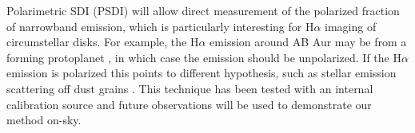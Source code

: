 Polarimetric SDI (PSDI) will allow direct measurement of the polarized fraction of narrowband emission, which is particularly interesting for H$\alpha$ imaging of circumstellar disks. For example, the H$\alpha$ emission around AB Aur may be from a forming protoplanet \citep{currie_images_2022}, in which case the emission should be unpolarized. If the H$\alpha$ emission is polarized this points to different hypothesis, such as stellar emission scattering off dust grains \citep{zhou_uv-optical_2023}. This technique has been tested with an internal calibration source and future observations will be used to demonstrate our method on-sky.